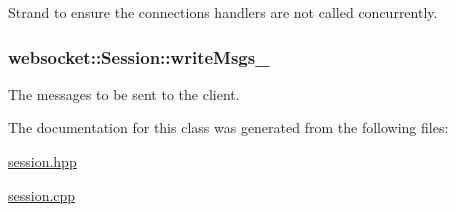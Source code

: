 Strand to ensure the connection\textquotesingle{}s handlers are not called concurrently. 

\subsubsection[{\texorpdfstring{write\+Msgs\+\_\+}{writeMsgs_}}]{ websocket\+::\+Session\+::write\+Msgs\+\_\+\hspace{0.3cm}{\ttfamily [private]}}\hypertarget{classwebsocket_1_1Session_ace231022157030f4d56de9bfeff43ac7}{}\label{classwebsocket_1_1Session_ace231022157030f4d56de9bfeff43ac7}


The messages to be sent to the client. 



The documentation for this class was generated from the following files\+:\begin{DoxyCompactItemize}
\item 
\hyperlink{session_8hpp}{session.\+hpp}\item 
\hyperlink{session_8cpp}{session.\+cpp}\end{DoxyCompactItemize}
